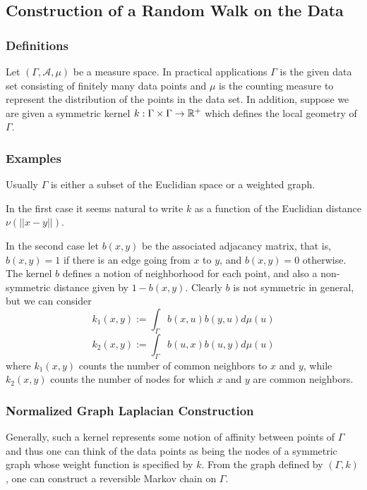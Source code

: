 \subsection{Construction of a Random Walk on the Data}
\subsubsection{Definitions}
Let $(\Gamma, \mathcal{A}, \mu)$ be a measure space. In practical applications $\Gamma$ is the given data set consisting of finitely many data points and $\mu$ is the counting measure to represent the distribution of the points in the data set. In addition, suppose we are given a symmetric kernel $k: \Gamma \times \Gamma \rightarrow \mathbb{R}^+$ which defines the local geometry of $\Gamma$.

\subsubsection{Examples}
Usually $\Gamma$ is either a subset of the Euclidian space or a weighted graph.

In the first case it seems natural to write $k$ as a function of the Euclidian distance $\nu(||x-y||)$.

In the second case let $b(x,y)$ be the associated adjacancy matrix, that is, $b(x,y) = 1$ if there is an edge going from $x$ to $y$, and $b(x,y) = 0$ otherwise. The kernel $b$ defines a notion of neighborhood for each point, and also a non-symmetric distance given by $1-b(x,y)$. Clearly $b$ is not symmetric in general, but we can consider
\begin{equation*}
k_1(x,y):=\int_\Gamma b(x,u)b(y,u)d\mu(u)
\end{equation*}
\begin{equation*}
k_2(x,y):=\int_\Gamma b(u,x)b(u,y)d\mu(u)
\end{equation*}
where $k_1(x,y)$ counts the number of common neighbors to $x$ and $y$, while $k_2(x,y)$ counts the number of nodes for which $x$ and $y$ are common neighbors.

\subsubsection{Normalized Graph Laplacian Construction}
Generally, such a kernel represents some notion of affinity between points of $\Gamma$ and thus one can think of the data points as being the nodes of a symmetric graph whose weight function is specified by $k$. From the graph defined by $(\Gamma, k)$, one can construct a reversible Markov chain on $\Gamma$.


